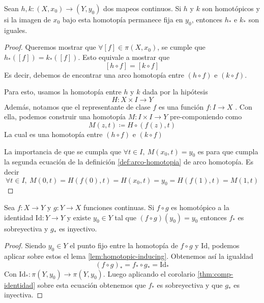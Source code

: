 \begin{lema} \label{lem:homotopic-inducing}
  Sean \(h,k : (X, x_0) \to (Y, y_0)\) dos mapeos continuos. Si \(h\) y
  \(k\) son homotópicos y si la imagen de \(x_0\) bajo esta homotopía permanece
  fija en \(y_0\), entonces \(h_*\) e \(k_*\) son iguales.
\end{lema}
\begin{proof}
  Queremos mostrar que \(\forall [f] \in \pi (X,x_0)\), se cumple que
  \(h_* ([f]) = k_* ([f])\). Esto equivale a mostrar que
  \[ [h \circ f] = [k \circ f] \]
  Es decir, debemos de encontrar una arco homotopía entre \((h \circ
  f)\) e \( (k \circ f)\).

  Para esto, usamos la homotopía entre \(h\) y \(k\) dada por la hipótesis
  \[H : X \times I \to Y \]
  Además, notamos que el representante de clase \(f\) es una función \(f
  : I \to X\) . Con ella, podemos construir una homotopía \(M : I \times I
  \to Y \) pre-componiendo como
  \[ M(z, t) \coloneqq H \circ (f(z), t) \]
  La cual es una homotopía entre \((h \circ f)\) e \((k \circ f)\)

  La importancia de que se cumpla que \( \forall t \in I,\ M (x_0, t) =
  y_0\) es para que cumpla la segunda ecuación de la definición
  \ref{def:arco-homotopia} de arco homotopía. Es decir
  \[ \forall t \in I ,\ M(0,t) = H \left( f (0), t \right) = H (x_0, t)
    = y_0 = H \left( f(1) , t \right) = M (1, t) \]
\end{proof}
\begin{teorema} \label{thm:comp-identidad-homotopia}
  Sea \(f : X \to Y\) y \(g : Y \to X\) funciones continuas. Si \(f
  \circ g\) es homotópico a la identidad \( \mathrm{Id} : Y \to Y\) y
  existe \(y_0 \in Y\) tal que \( (f \circ g ) (y_0) = y_0 \) entonces
  \(f_*\) es sobreyectiva y \(g_*\) es inyectivo.
\end{teorema}
\begin{proof}
  Siendo \(y_0 \in Y\) el punto fijo entre la homotopía de \(f \circ g\)
  y \(\mathrm{Id}\), podemos aplicar sobre estos el lema
  \ref{lem:homotopic-inducing}. Obtenemos así la igualdad
  \[ (f \circ g)_{*} = f_* \circ g_* = \mathrm{Id}_* \]
  Con \(\mathrm{Id}_* : \pi (Y, y_0) \to \pi (Y, y_0)\). Luego
  aplicando el corolario \ref{thm:comp-identidad} sobre esta ecuación
  obtenemos que \(f_*\) es sobreyectiva y que \(g_*\) es inyectiva.
\end{proof}


